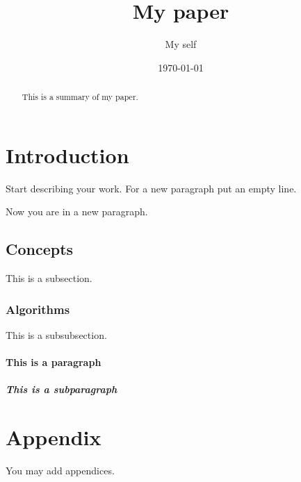 \documentclass[10pt, a4paper]{article}
\title{My paper}
\author{My self}
\date{\today}
\begin{document}
\maketitle
\begin{abstract}
This is a summary of my paper.
\end{abstract}
\tableofcontents
%
\section{Introduction}
Start describing your work. 
For a new paragraph put an empty line.

Now you are in a new paragraph.
%
\subsection{Concepts}
This is a subsection.
\subsubsection{Algorithms}
This is a subsubsection.
\paragraph{This is a paragraph}
\subparagraph{This is a subparagraph}
%
\appendix
\section{Appendix}
You may add appendices.
\end{document}
